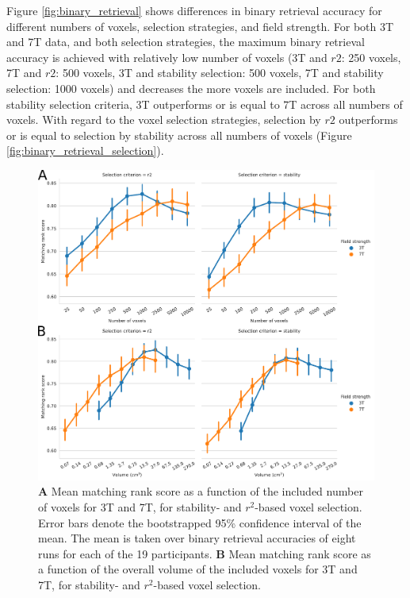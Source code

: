 Figure \ref{fig:binary_retrieval} shows differences in binary retrieval accuracy
for different numbers of voxels, selection strategies, and field strength.
For both 3T and 7T data, and both selection strategies, the maximum binary
retrieval accuracy is achieved with relatively low number of voxels (3T and
$r2$: 250 voxels, 7T and $r2$: 500 voxels, 3T and stability selection: 500
voxels, 7T and stability selection: 1000 voxels) and decreases the more voxels are
included.
For both stability selection criteria, 3T outperforms or is equal to 7T across
all numbers of voxels.
With regard to the voxel selection strategies, selection by $r2$ outperforms or
is equal to selection by stability across all numbers of voxels (Figure
\ref{fig:binary_retrieval_selection}).

\begin{figure}
  \centering
    \includegraphics[width=\linewidth]{pics/rank.pdf}
	
  \caption{\textbf{A} Mean matching rank score as a function of the included number
  of voxels for 3T and 7T, for stability- and $r^2$-based voxel selection.
  Error bars denote the bootstrapped 95\% confidence interval of the mean. The
  mean is taken over binary retrieval accuracies of eight runs for each of the
  19 participants. \textbf{B} Mean matching rank score as a function of the overall
volume of the included voxels for 3T and 7T, for stability- and
$r^2$-based voxel selection.}

 \label{fig:matching_score}
\end{figure}

